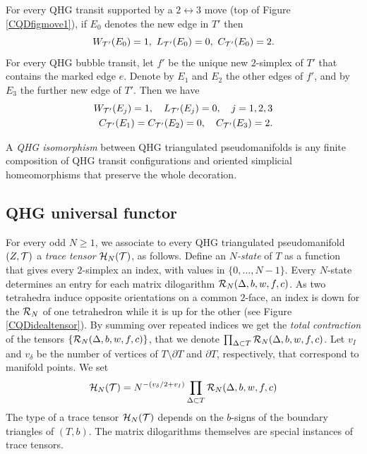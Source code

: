 \begin{remark}\label{forced}{\rm
For every QHG transit supported by a $2 \leftrightarrow 3$ move
(top of Figure \ref{CQDfigmove1}), if $E_0$ denotes the new edge
in $T'$ then \begin{equation}\label{2-3comp} W_{{\mathcal T}'}(E_0)=1, \
L_{{\mathcal T}'}(E_0)=0, \ C_{{\mathcal T}'}(E_0)=2.\end{equation} For every QHG
bubble transit, let $f'$ be the unique new $2$-simplex of $T'$
that contains the marked edge $e$. Denote by $E_1$ and $E_2$ the
other edges of $f'$, and by $E_3$ the further new edge of $T'$.
Then we have} \begin{eqnarray}\label{bubblecomp}
 W_{{\mathcal T}'}(E_j)=1, \quad  L_{{\mathcal T}'}(E_j)=0, \quad j=1,2,3 \\
C_{{\mathcal T}'}(E_1)=C_{{\mathcal T}'}(E_2)= 0, \quad C_{{\mathcal T}'}(E_3)=2.\nonumber
\end{eqnarray}
\end{remark}

\begin{defi}\label{QHGisom}{\rm A {\it QHG isomorphism} between
    QHG triangulated pseudomanifolds is any finite composition of QHG
    transit configurations and oriented simplicial homeomorphisms
that preserve the whole decoration.}
\end{defi}

\subsection{QHG universal functor}\label{QHGFUNC} For every odd
$N\geq 1$, we associate to every QHG triangulated pseudomanifold
$(Z,{\mathcal T})$ a {\it trace tensor} ${\mathcal H}_N({\mathcal T})$, as follows.  Define
an {\it $N$-state} of $T$ as a function that gives every
$2$-simplex an index, with values in $\{0,\dots,N-1\}$. Every
$N$-state determines an entry for each matrix dilogarithm
${\mathcal R}_N(\Delta, b, w, f,c)$. As two tetrahedra induce opposite
orientations on a common $2$-face, an index is down for the
${\mathcal R}_N$ of one tetrahedron while it is up for the other (see
Figure \ref{CQDidealtensor}). By summing over repeated indices we
get the {\it total contraction} of the tensors $\{{\mathcal R}_N(\Delta, b,
w, f,c)\}$, that we denote $\textstyle \prod_{\Delta \subset T}
{\mathcal R}_N(\Delta,b,w,f,c)$. Let $v_I$ and $v_\delta$ be the number of
vertices of $T\setminus \partial T$ and $\partial T$,
respectively, that correspond to manifold points. We set
\begin{equation}\label{deftt}
{\mathcal H}_N({\mathcal T}) = N^{-(v_\delta/2 + v_I)}\prod_{\Delta \subset T}
{\mathcal R}_N(\Delta,b,w,f,c)
\end{equation}
The type of a trace tensor ${\mathcal H}_N({\mathcal T})$ depends on the $b$-signs
of the boundary triangles of $(T,b)$. The matrix dilogarithms
themselves are special instances of trace tensors.

